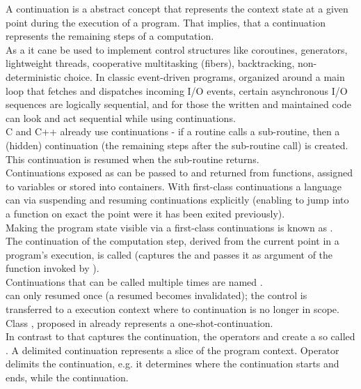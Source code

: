 
A continuation is a abstract concept that represents the context state at a
given point during the execution of a program. That implies, that a continuation
represents the remaining steps of a computation.\\

As a  it cane be used to implement control
structures like coroutines,  generators, lightweight threads, cooperative
multitasking (fibers), backtracking, non-deterministic choice. In classic
event-driven programs, organized around a main loop that fetches and dispatches
incoming I/O events, certain asynchronous I/O sequences are logically
sequential, and for those the written and maintained code can look and act
sequential while using continuations.\\

C and C++ already use continuations - if a routine calls a sub-routine, then a
(hidden) continuation (the remaining steps after the sub-routine call) is
created. This continuation is resumed when the sub-routine returns.\\

Continuations exposed as  can be passed to and
returned from functions, assigned to variables or stored into containers. With
first-class continuations a language can 
via suspending and resuming continuations explicitly (enabling to jump into a
function on exact the point were it has been exited previously).\\
Making the program state visible via a first-class continuations is known as
.\\

The continuation of the computation step, derived from the current point in a
program's execution, is called  (\cc captures the
 and passes it as argument of the function invoked by
\cc).\\

Continuations that can be called multiple times are named
.\\
 can only resumed once (a resumed 
 becomes invalidated); the control is transferred to
a execution context where to continuation is no longer in scope.\\
Class , proposed in \cite{P0099R1}
already represents a one-shot-continuation.\\

In contrast to \cc that captures the  continuation, the
operators \shift and \reset create a so called . A
delimited continuation represents a slice of the program context. Operator
\reset delimits the continuation, e.g. it determines where the continuation
starts and ends, while \shift {} the continuation.

